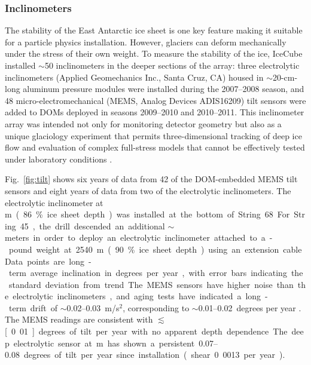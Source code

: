 \subsubsection{Inclinometers}

The stability of the East Antarctic ice sheet is one key feature making it
suitable for a particle physics installation.  However, glaciers can
deform mechanically under the stress of their own weight.  To measure the
stability of the ice, IceCube installed $\sim$50
inclinometers in the deeper sections of the array: three 
electrolytic inclinometers (Applied Geomechanics Inc., Santa Cruz, CA)
housed in $\sim$20-cm-long aluminum pressure modules were installed during
the 2007--2008 season, and 48 micro-electromechanical (MEMS, Analog Devices
ADIS16209) tilt sensors were added to DOMs deployed in seasons 2009--2010 and
2010--2011.  This inclinometer array was intended not only for monitoring
detector geometry but also as a unique glaciology experiment that
permits three-dimensional tracking of deep ice flow and evaluation of complex
full-stress models that cannot be effectively tested under laboratory
conditions \cite{pattyn03}.

Fig.~\ref{fig:tilt} shows
six years of data from 42 of the DOM-embedded MEMS tilt sensors and
eight years of data from two of the electrolytic inclinometers. The electrolytic inclinometer at \unit[2455]m (86\% ice sheet depth) was
installed at the bottom of String 68.  For String 45, the drill
descended an additional $\sim$\unit[100]meters in order to deploy an
electrolytic inclinometer attached to a \unit[100]-pound weight at 2540 m
(90\% ice sheet depth) using an extension cable. Data
points are long-term average inclination in degrees per year, with error
bars indicating the standard deviation from trend.  The MEMS sensors have
higher noise than the electrolytic inclinometers, and aging tests have indicated a long-term
drift of $\sim$\numrange[range-phrase = --]{0.02}{0.03}~m/s$^2$, corresponding to
$\sim$\numrange[range-phrase = --]{0.01}{0.02}~degrees per year
\cite{inclinometer_comm}. The MEMS readings are consistent with
$\lesssim$\unit[0.01]degrees of tilt per year with no apparent depth
dependence.  The deep electrolytic sensor 
at \unit[2540]m has shown a persistent \numrange[range-phrase =
  --]{0.07}{0.08} degrees of tilt per year since installation (shear 0.0013
per year).

